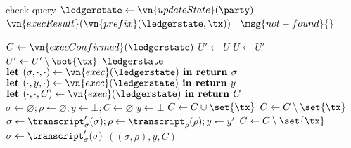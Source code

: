 \begin{protocol}{\kachina}
  \begin{receive}{check-query}{\tx}
    \State \Let $\ledgerstate \gets \vn{updateState}(\party)$
    \If{$\tx \in \ledgerstate$}
      \Return $\vn{execResult}(\vn{prefix}(\ledgerstate, \tx))$
    \Else
      ~\Return $\msg{not-found}{}$
    \EndIf
  \end{receive}

  \begin{helpers}
      \State {}
      \State \Let $C \gets \vn{execConfirmed}(\ledgerstate)$
      \State \Let $U' \gets U$
      \Repeat
        \State \Let $U \gets U'$
            \State \Let $U' \gets U' \setminus \set{\tx}$
          \EndIf
        \EndFor
      \State \Return $\ledgerstate$
    \EndProcedure
      \State $\textbf{let }(\sigma, \cdot, \cdot) \gets \vn{exec}(\ledgerstate)
      \textbf{ in return } \sigma$
    \EndProcedure
      \State $\textbf{let }(\cdot, y, \cdot) \gets \vn{exec}(\ledgerstate)
      \textbf{ in return } y$
    \EndProcedure
      \State $\textbf{let }(\cdot, \cdot, C) \gets \vn{exec}(\ledgerstate)
      \textbf{ in return } C$
    \EndProcedure
      \State \Let $\sigma \gets \varnothing; \rho \gets \varnothing; y \gets
        \bot; C \gets \varnothing$
          \Continue
        \EndIf
        \State \Let $y \gets \bot$
          \Continue
        \EndIf
          \Continue
        \EndIf
        \State \Let $C \gets C \cup \set{\tx}$
              \State \Let $C \gets C \setminus \set{\tx}$
              \State \Break
            \EndIf
            \State \Let $\sigma \gets \transcript_\sigma'(\sigma); \rho \gets
              \transcript_\rho(\rho); y \gets y'$
          \EndFor
        \Else
            \If{$\transcript_\sigma(\sigma) = \bot$}
              \State \Let $C \gets C \setminus \set{\tx}$
              \State \Break
            \EndIf
            \State \Let $\sigma \gets \transcript_\sigma'(\sigma)$
          \EndFor
        \EndIf
      \EndFor
      \State \Return $((\sigma, \rho), y, C)$
    \EndProcedure
  \end{helpers}
\end{protocol}

